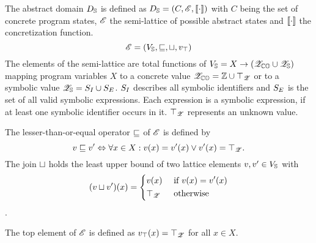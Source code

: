 The abstract domain $D_{\mathbb{S}}$ is defined as
$D_{\mathbb{S}} = (C, \mathscr{E}, [\![ \cdot ]\!] )$
with $C$ being the set of concrete program states, $\mathscr{E}$ the semi-lattice of possible abstract states and $[\![ \cdot ]\!]$ the concretization function.
\[\mathscr{E} = (V_{\mathbb{S}},
                  \sqsubseteq, 
                  \sqcup, 
                  v_\top
                )        
\]
The elements of the semi-lattice are total functions of $V_{\mathbb{S}} = X \rightarrow (\mathscr{Z}_{\mathbb{CO}} \cup \mathscr{Z}_{\mathbb{S}})$ mapping program variables $X$ to a concrete value $\mathscr{Z}_{\mathbb{CO}} = \mathbb{Z} \cup {\top_{\mathscr{Z}}}$
or to a symbolic value $\mathscr{Z}_{\mathbb{S}} = S_I \cup S_E$.
$S_I$ describes all symbolic identifiers and
$S_E$ is the set of all valid symbolic expressions. Each expression is a symbolic expression, if at least one symbolic identifier occurs in it.
$\top_{\mathscr{Z}}$ represents an unknown value.

The lesser-than-or-equal operator $\sqsubseteq$ of $\mathscr{E}$ is defined by
  \[ v \sqsubseteq v' \Leftrightarrow \forall x \in X: v(x) = v'(x) \vee v'(x) = \top_{\mathscr{Z}}\text{.} \]
The join $\sqcup$ holds the least upper bound of two lattice elements $v, v' \in V_{\mathbb{S}}$ with
  \[ (v \sqcup v')(x) = \begin{dcases}
                    v(x) & \text{ if $v(x) = v'(x)$} \\
                  \top_{\mathscr{Z}} & \text{ otherwise }
                \end{dcases}
  \].

The top element of $\mathscr{E}$ is defined as $v_\top(x) = \top_{\mathscr{Z}}$ for all $x \in X$. 

